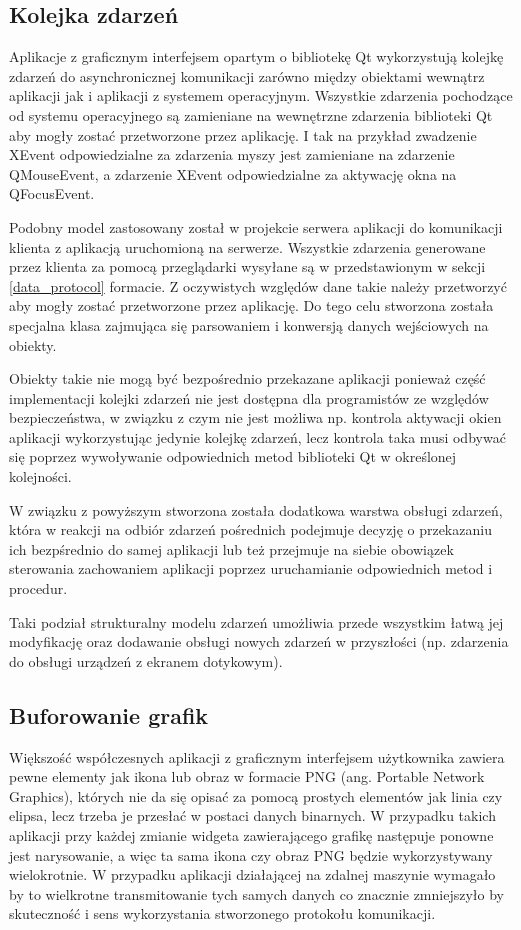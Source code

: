 \subsection{Kolejka zdarzeń}
Aplikacje z graficznym interfejsem opartym o bibliotekę Qt wykorzystują kolejkę zdarzeń do asynchronicznej komunikacji zarówno między obiektami wewnątrz aplikacji jak i aplikacji z systemem operacyjnym. Wszystkie zdarzenia pochodzące od systemu operacyjnego są zamieniane na wewnętrzne zdarzenia biblioteki Qt aby mogły zostać przetworzone przez aplikację. I tak na przykład zwadzenie XEvent odpowiedzialne za zdarzenia myszy jest zamieniane na zdarzenie QMouseEvent, a zdarzenie XEvent odpowiedzialne za aktywację okna na QFocusEvent. 

Podobny model zastosowany został w projekcie serwera aplikacji do komunikacji klienta z aplikacją uruchomioną na serwerze. Wszystkie zdarzenia generowane przez klienta za pomocą przeglądarki wysyłane są w przedstawionym w sekcji \ref{data_protocol} formacie. Z oczywistych względów dane takie należy przetworzyć aby mogły zostać przetworzone przez aplikację. Do tego celu stworzona została specjalna klasa zajmująca się parsowaniem i konwersją danych wejściowych na obiekty. 

Obiekty takie nie mogą być bezpośrednio przekazane aplikacji ponieważ część implementacji kolejki zdarzeń nie jest dostępna dla programistów ze względów bezpieczeństwa, w związku z czym nie jest możliwa np. kontrola aktywacji okien aplikacji wykorzystując jedynie kolejkę zdarzeń, lecz kontrola taka musi odbywać się poprzez wywoływanie odpowiednich metod biblioteki Qt w określonej kolejności.

W związku z powyższym stworzona została dodatkowa warstwa obsługi zdarzeń, która w reakcji na odbiór zdarzeń pośrednich podejmuje decyzję o przekazaniu ich bezpśrednio do samej aplikacji lub też przejmuje na siebie obowiązek sterowania zachowaniem aplikacji poprzez uruchamianie odpowiednich metod i procedur. 

Taki podział strukturalny modelu zdarzeń umożliwia przede wszystkim łatwą jej modyfikację oraz dodawanie obsługi nowych zdarzeń w przyszłości (np. zdarzenia do obsługi urządzeń z ekranem dotykowym).

\subsection{Buforowanie grafik}
Większość współczesnych aplikacji z graficznym interfejsem użytkownika zawiera pewne elementy jak ikona lub obraz w formacie PNG (ang. Portable Network Graphics), których nie da się opisać za pomocą prostych elementów jak linia czy elipsa, lecz trzeba je przesłać w postaci danych binarnych. W przypadku takich aplikacji przy każdej zmianie widgeta zawierającego grafikę następuje ponowne jest narysowanie, a więc ta sama ikona czy obraz PNG będzie wykorzystywany wielokrotnie. W przypadku aplikacji działającej na zdalnej maszynie wymagało by to wielkrotne transmitowanie tych samych danych co znacznie zmniejszyło by skuteczność i sens wykorzystania stworzonego protokołu komunikacji.

